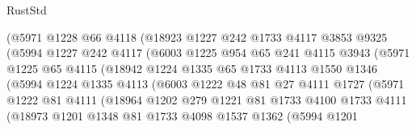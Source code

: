 \begin{lexlean}{RustStd}
\begin{coremodule}
                    (@5971
                      @1228
                      @66
                      @4118
                      (@18923
                        @1227
                        @242
                        @1733
                        @4117
                        @3853
                        @9325
                        (@5994
                          @1227
                          @242
                          @4117
                          (@6003
                            @1225
                            @954
                            @65
                            @241
                            @4115
                            @3943
                            (@5971
                              @1225
                              @65
                              @4115
                              (@18942
                                @1224
                                @1335
                                @65
                                @1733
                                @4113
                                @1550
                                @1346
                                (@5994
                                  @1224
                                  @1335
                                  @4113
                                  (@6003
                                    @1222
                                    @48
                                    @81
                                    @27
                                    @4111
                                    @1727
                                    (@5971
                                      @1222
                                      @81
                                      @4111
                                      (@18964
                                        @1202
                                        @279
                                        @1221
                                        @81
                                        @1733
                                        @4100
                                        @1733
                                        @4111
                                        (@18973
                                          @1201
                                          @1348
                                          @81
                                          @1733
                                          @4098
                                          @1537
                                          @1362
                                          (@5994
                                            @1201

\end{coremodule}
\end{lexlean}
